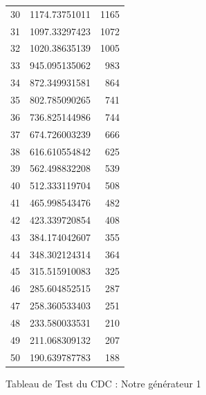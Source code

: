 \documentclass[10pt,a4paper]{article}
\begin{document}
\begin{figure}[h]
\begin{tabular}{|r|r|r|}
30 & 1174.73751011 & 1165\\
31 & 1097.33297423 & 1072\\
32 & 1020.38635139 & 1005\\
33 & 945.095135062 & 983\\
34 & 872.349931581 & 864\\
35 & 802.785090265 & 741\\
36 & 736.825144986 & 744\\
37 & 674.726003239 & 666\\
38 & 616.610554842 & 625\\
39 & 562.498832208 & 539\\
40 & 512.333119704 & 508\\
41 & 465.998543476 & 482\\
42 & 423.339720854 & 408\\
43 & 384.174042607 & 355\\
44 & 348.302124314 & 364\\
45 & 315.515910083 & 325\\
46 & 285.604852515 & 287\\
47 & 258.360533403 & 251\\
48 & 233.580033531 & 210\\
49 & 211.068309132 & 207\\
50 & 190.639787783 & 188\\
\hline
\end{tabular}
\caption{Tableau de Test du CDC : Notre générateur 1}
\end{figure}


\newpage
\end{document}
